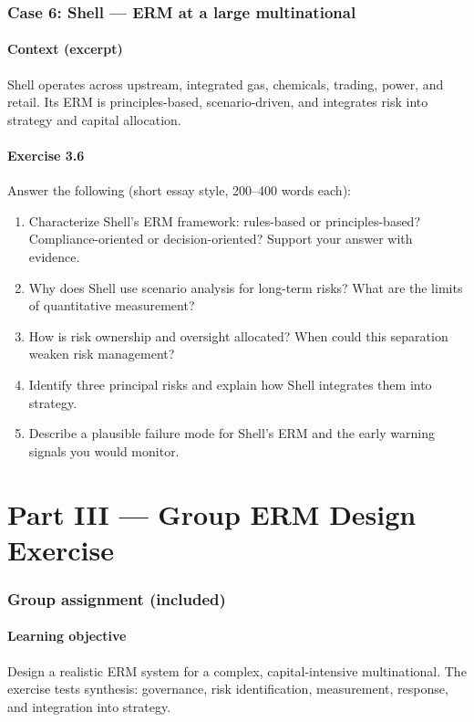 \documentclass[11pt]{article}
\begin{document}
\newpage
\section{Case 6: Shell --- ERM at a large multinational}
\subsection*{Context (excerpt)}
Shell operates across upstream, integrated gas, chemicals, trading, power, and retail. Its ERM is principles-based, scenario-driven, and integrates risk into strategy and capital allocation.

\subsection*{Exercise 3.6}
Answer the following (short essay style, 200--400 words each):
\begin{enumerate}
  \item Characterize Shell's ERM framework: rules-based or principles-based? Compliance-oriented or decision-oriented? Support your answer with evidence.
  \item Why does Shell use scenario analysis for long-term risks? What are the limits of quantitative measurement?
  \item How is risk ownership and oversight allocated? When could this separation weaken risk management?
  \item Identify three principal risks and explain how Shell integrates them into strategy.
  \item Describe a plausible failure mode for Shell's ERM and the early warning signals you would monitor.
\end{enumerate}

\newpage
\part*{Part III --- Group ERM Design Exercise}

\section*{Group assignment (included)}
\subsection*{Learning objective}
Design a realistic ERM system for a complex, capital-intensive multinational. The exercise tests synthesis: governance, risk identification, measurement, response, and integration into strategy.
\end{document}
